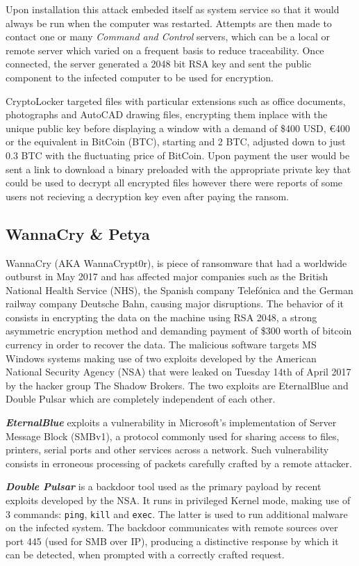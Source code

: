 \documentclass[10pt,a4paper]{article}
\begin{document}
Upon installation this attack embeded itself as system service so that it would always be run when the computer was restarted. Attempts are then made to contact one or many \textit{Command and Control} servers, which can be a local or remote server which varied on a frequent basis to reduce traceability. Once connected, the server generated a 2048 bit RSA key and sent the public component to the infected computer to be used for encryption.

CryptoLocker targeted files with particular extensions such as office documents, photographs and AutoCAD drawing files, encrypting them inplace with the unique public key before displaying a window with a demand of \$400 USD, \euro400 or the equivalent in BitCoin (BTC), starting and 2 BTC, adjusted down to just 0.3 BTC with the fluctuating price of BitCoin. Upon payment the user would be sent a link to download a binary preloaded with the appropriate private key that could be used to decrypt all encrypted files however there were reports of some users not recieving a decryption key even after paying the ransom.

\subsection{WannaCry \& Petya}
WannaCry (AKA WannaCrypt0r), is piece of ransomware that had a worldwide outburst in May 2017 and has affected major companies such as the British National Health Service (NHS), the Spanish company Telefónica and the German railway company Deutsche Bahn, causing major disruptions. The behavior of it consists in encrypting the data on the machine using RSA 2048, a strong asymmetric encryption method and demanding payment of \$300 worth of bitcoin currency in order to recover the data. The malicious software targets MS Windows systems making use of two exploits developed by the American National Security Agency (NSA) that were leaked on Tuesday 14th of April 2017 by the hacker group The Shadow Brokers. The two exploits are EternalBlue and Double Pulsar which are completely independent of each other.

\textbf{\textit{EternalBlue}} exploits a vulnerability in Microsoft's implementation of Server Message Block (SMBv1), a protocol commonly used for sharing access to files, printers, serial ports and other services across a network. Such vulnerability consists in erroneous processing of packets carefully crafted by a remote attacker.

\textbf{\textit{Double Pulsar}} is a backdoor tool used as the primary payload by recent exploits developed by the NSA. It runs in privileged Kernel mode, making use of 3 commands: \texttt{ping}, \texttt{kill} and \texttt{exec}. The latter is used to run additional malware on the infected system. The backdoor communicates with remote sources over port 445 (used for SMB over IP), producing a distinctive response by which it can be detected, when prompted with a correctly crafted request.
\end{document}
